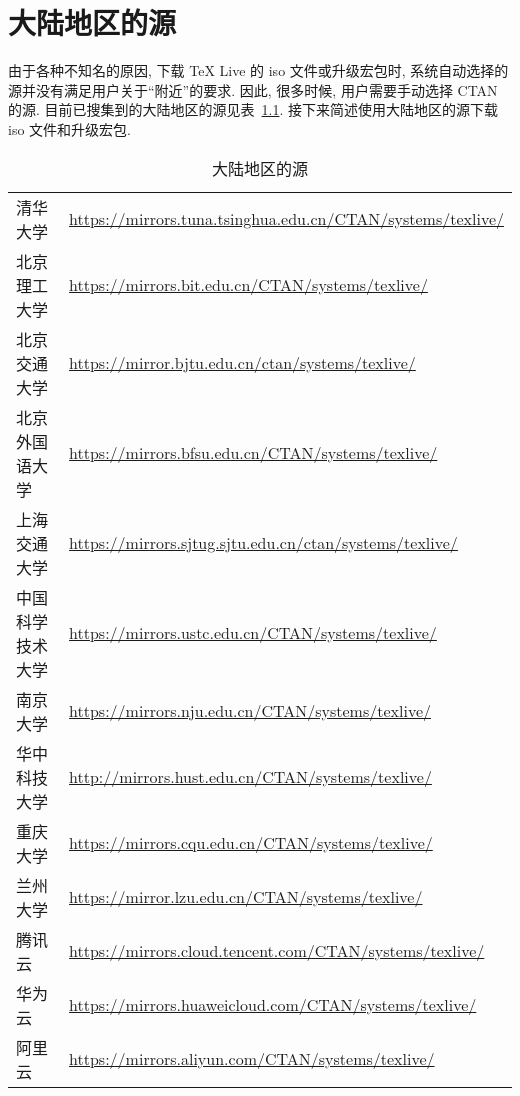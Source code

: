 
\chapter{大陆地区的源}\label{chp:appendix:mirror}

由于各种不知名的原因,
下载 \TeX{} Live 的 iso 文件或升级宏包时,
系统自动选择的源并没有满足用户关于``附近''的要求.
因此,
很多时候,
用户需要手动选择 CTAN 的源.
目前已搜集到的大陆地区的源见表~\ref{tab:appendix:mirror}.
接下来简述使用大陆地区的源下载 iso 文件和升级宏包.

\begin{table}
  \centering
  \caption{大陆地区的源}\label{tab:appendix:mirror}
  \begin{tabular}{*{2}{l}}
    \hline\hline
    清华大学 & \url{https://mirrors.tuna.tsinghua.edu.cn/CTAN/systems/texlive/}\\
    北京理工大学 & \url{https://mirrors.bit.edu.cn/CTAN/systems/texlive/}\\
    北京交通大学 & \url{https://mirror.bjtu.edu.cn/ctan/systems/texlive/}\\
    北京外国语大学 & \url{https://mirrors.bfsu.edu.cn/CTAN/systems/texlive/}\\
    上海交通大学 & \url{https://mirrors.sjtug.sjtu.edu.cn/ctan/systems/texlive/}\\
    中国科学技术大学 & \url{https://mirrors.ustc.edu.cn/CTAN/systems/texlive/}\\
    南京大学 & \url{https://mirrors.nju.edu.cn/CTAN/systems/texlive/}\\
    华中科技大学 & \url{http://mirrors.hust.edu.cn/CTAN/systems/texlive/}\\
    重庆大学 & \url{https://mirrors.cqu.edu.cn/CTAN/systems/texlive/}\\
    兰州大学 & \url{https://mirror.lzu.edu.cn/CTAN/systems/texlive/}\\
    腾讯云 & \url{https://mirrors.cloud.tencent.com/CTAN/systems/texlive/}\\
    华为云 & \url{https://mirrors.huaweicloud.com/CTAN/systems/texlive/}\\
    阿里云 & \url{https://mirrors.aliyun.com/CTAN/systems/texlive/}\\
    \hline\hline
  \end{tabular}
\end{table}

